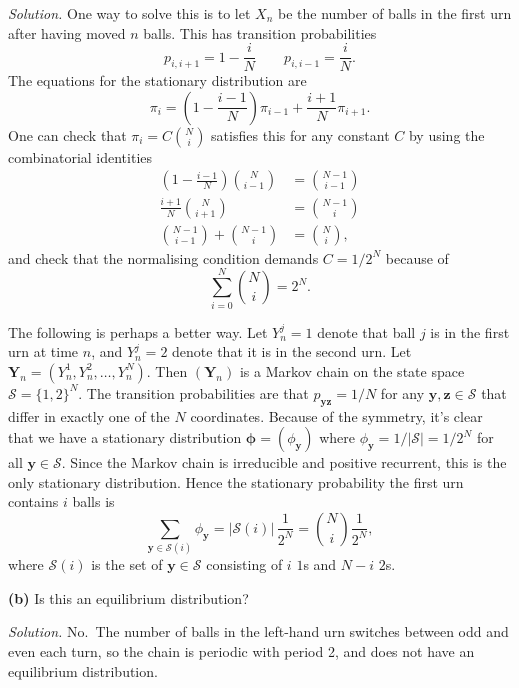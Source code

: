 \documentclass[
  a4paper,
]{article}
\theoremstyle{definition}
\theoremstyle{definition}
\theoremstyle{definition}
\theoremstyle{remark}
\begin{document}
\begin{myanswers}
\emph{Solution.} One way to solve this is to let \(X_n\) be the number of balls in the first urn after having moved \(n\) balls. This has transition probabilities
\[ p_{i,i+1} = 1 - \frac{i}{N} \qquad p_{i,i-1} = \frac{i}{N} . \]
The equations for the stationary distribution are
\[ \pi_i = \left(1 - \frac{i-1}{N}\right)\pi_{i-1} + \frac{i+1}N \pi_{i+1} . \]
One can check that \(\pi_i = C \binom{N}{i}\) satisfies this for any constant \(C\) by using the combinatorial identities
\begin{align*}
\left(1 - \frac{i-1}{N}\right)\binom{N}{i-1} &= \binom{N-1}{i-1} \\
\frac{i+1}N \binom{N}{i+1} &= \binom{N-1}{i} \\
\binom{N-1}{i-1} + \binom{N-1}{i} &= \binom Ni ,
\end{align*}
and check that the normalising condition demands \(C = 1/2^N\) because of
\[ \sum_{i=0}^N \binom Ni = 2^N . \]

The following is perhaps a better way. Let \(Y_n^j = 1\) denote that ball \(j\) is in the first urn at time \(n\), and \(Y_n^j = 2\) denote that it is in the second urn. Let \(\mathbf Y_n = (Y_n^1, Y_n^2, \dots, Y_n^N)\). Then \((\mathbf Y_n)\) is a Markov chain on the state space \(\mathcal S = \{1,2\}^N\). The transition probabilities are that \(p_{\mathbf{yz}} = 1/N\) for any \(\mathbf y, \mathbf z \in \mathcal S\) that differ in exactly one of the \(N\) coordinates. Because of the symmetry, it's clear that we have a stationary distribution \(\boldsymbol\phi = (\phi_{\mathbf y})\) where \(\phi_{\mathbf y} = 1/|\mathcal S| = 1/2^N\) for all \(\mathbf y \in \mathcal S\). Since the Markov chain is irreducible and positive recurrent, this is the only stationary distribution. Hence the stationary probability the first urn contains \(i\) balls is
\[ \sum_{\mathbf y \in \mathcal S(i)} \phi_{\mathbf y}  = \big|\mathcal S(i)\big|\, \frac{1}{2^N} = \binom{N}{i} \frac 1{2^N} , \]
where \(\mathcal S(i)\) is the set of \(\mathbf y \in \mathcal S\) consisting of \(i\) \(1\)s and \(N-i\) \(2\)s.

\end{myanswers}

\textbf{(b)} Is this an equilibrium distribution?

\begin{myanswers}
\emph{Solution.} No.~The number of balls in the left-hand urn switches between odd and even each turn, so the chain is periodic with period 2, and does not have an equilibrium distribution.

\end{myanswers}
\end{document}
